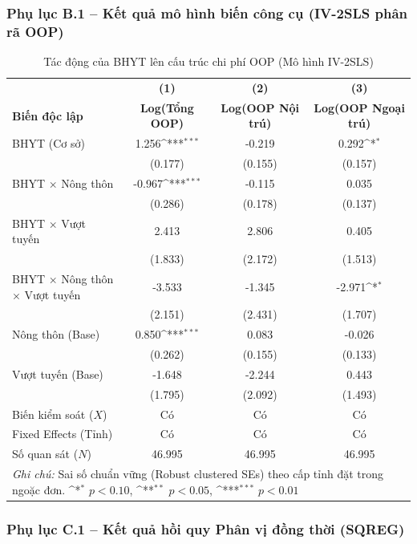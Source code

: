 \documentclass[12pt,a4paper]{article}
\begin{document}
\newpage
\subsubsection{Phụ lục B.1 – Kết quả mô hình biến công cụ (IV-2SLS phân rã OOP)}

\begin{table}[htbp]
	\centering
	\def\sym#1{\ifmmode^{#1}\else\(^{#1}\)\fi}
	\caption{Tác động của BHYT lên cấu trúc chi phí OOP (Mô hình IV-2SLS)}
	\label{tab:iv_appendix}
	\begin{tabular}{lccc}
		\toprule
		&\textbf{(1)}&\textbf{(2)}&\textbf{(3)}\\
		\textbf{Biến độc lập}&\textbf{Log(Tổng OOP)}&\textbf{Log(OOP Nội trú)}&\textbf{Log(OOP Ngoại trú)}\\
		\midrule
		BHYT (Cơ sở) & 1.256\sym{***} & -0.219 & 0.292\sym{*} \\
		& (0.177) & (0.155) & (0.157) \\
		\addlinespace
		BHYT $\times$ Nông thôn & -0.967\sym{***} & -0.115 & 0.035 \\
		& (0.286) & (0.178) & (0.137) \\
		\addlinespace
		BHYT $\times$ Vượt tuyến & 2.413 & 2.806 & 0.405 \\
		& (1.833) & (2.172) & (1.513) \\
		\addlinespace
		BHYT $\times$ Nông thôn $\times$ Vượt tuyến & -3.533 & -1.345 & -2.971\sym{*} \\
		& (2.151) & (2.431) & (1.707) \\
		\addlinespace
		Nông thôn (Base) & 0.850\sym{***} & 0.083 & -0.026 \\
		& (0.262) & (0.155) & (0.133) \\
		\addlinespace
		Vượt tuyến (Base) & -1.648 & -2.244 & 0.443 \\
		& (1.795) & (2.092) & (1.493) \\
		\midrule
		Biến kiểm soát ($X$) & Có & Có & Có \\
		Fixed Effects (Tỉnh) & Có & Có & Có \\
		\midrule
		Số quan sát ($N$) & 46.995 & 46.995 & 46.995 \\
		\bottomrule
		\multicolumn{4}{p{13cm}}{\footnotesize \textit{Ghi chú:} Sai số chuẩn vững (Robust clustered SEs) theo cấp tỉnh đặt trong ngoặc đơn. \sym{*} \(p<0.10\), \sym{**} \(p<0.05\), \sym{***} \(p<0.01\)}
	\end{tabular}
\end{table}

\newpage
\subsubsection{Phụ lục C.1 – Kết quả hồi quy Phân vị đồng thời (SQREG)}
\end{document}
